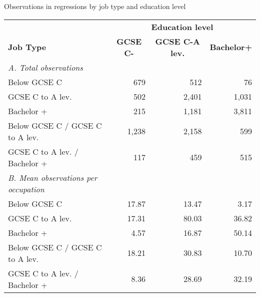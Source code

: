 \begin{center}
\begin{threeparttable}[!h]
\caption{Observations in regressions by job type and education level}
\label{tab:nobs}
\begin{tabular}{lrrr}
\toprule
\toprule
& \multicolumn{3}{c}{\textbf{Education level}} \\
\cline{2-4}
\textbf{Job Type}&\multicolumn{1}{c}{\textbf{GCSE C-}}&\multicolumn{1}{c}{\textbf{GCSE C-A lev.}}&\multicolumn{1}{c}{\textbf{Bachelor+}} \\
\midrule
\textit{A. Total observations} \\
\hspace{3mm}Below GCSE C&         679         &         512         &          76         \\
\hspace{3mm}GCSE C to A lev.&         502         &       2,401         &       1,031         \\
\hspace{3mm}Bachelor +&         215         &       1,181         &       3,811         \\
\hspace{3mm}Below GCSE C / GCSE C to A lev.&       1,238         &       2,158         &         599         \\
\hspace{3mm}GCSE C to A lev. / Bachelor + \vspace{3mm}&         117         &         459         &         515         \\
\textit{B. Mean observations per occupation} \\
\hspace{3mm}Below GCSE C&       17.87         &       13.47         &        3.17         \\
\hspace{3mm}GCSE C to A lev.&       17.31         &       80.03         &       36.82         \\
\hspace{3mm}Bachelor +&        4.57         &       16.87         &       50.14         \\
\hspace{3mm}Below GCSE C / GCSE C to A lev.&       18.21         &       30.83         &       10.70         \\
\hspace{3mm}GCSE C to A lev. / Bachelor + \vspace{3mm}&        8.36         &       28.69         &       32.19         \\

\end{tabular}
\end{threeparttable}
\end{center}
